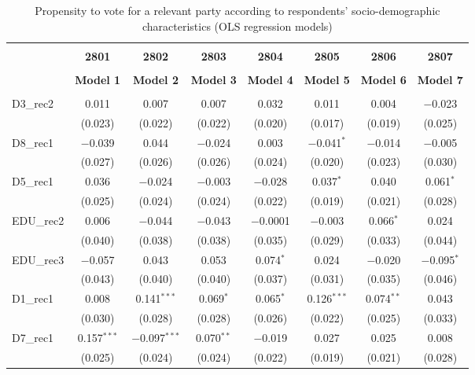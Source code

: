 \documentclass[
]{article}
\begin{document}
\begin{table}[!htbp] \centering 
  \caption{Propensity to vote for a relevant party according to respondents' 
                     socio-demographic characteristics (OLS regression models)} 
  \label{table:full_ols_uk} 
\begin{tabular}{@{\extracolsep{5pt}}lccccccc} 
\\[-1.8ex]\hline \\[-1.8ex] 
 & \textbf{2801} & \textbf{2802} & \textbf{2803} & \textbf{2804} & \textbf{2805} & \textbf{2806} & \textbf{2807} \\ 
\\[-1.8ex] & \textbf{Model 1} & \textbf{Model 2} & \textbf{Model 3} & \textbf{Model 4} & \textbf{Model 5} & \textbf{Model 6} & \textbf{Model 7}\\ 
\hline \\[-1.8ex] 
 D3\_rec2 & 0.011 & 0.007 & 0.007 & 0.032 & 0.011 & 0.004 & $-$0.023 \\ 
  & (0.023) & (0.022) & (0.022) & (0.020) & (0.017) & (0.019) & (0.025) \\ 
  D8\_rec1 & $-$0.039 & 0.044 & $-$0.024 & 0.003 & $-$0.041$^{*}$ & $-$0.014 & $-$0.005 \\ 
  & (0.027) & (0.026) & (0.026) & (0.024) & (0.020) & (0.023) & (0.030) \\ 
  D5\_rec1 & 0.036 & $-$0.024 & $-$0.003 & $-$0.028 & 0.037$^{*}$ & 0.040 & 0.061$^{*}$ \\ 
  & (0.025) & (0.024) & (0.024) & (0.022) & (0.019) & (0.021) & (0.028) \\ 
  EDU\_rec2 & 0.006 & $-$0.044 & $-$0.043 & $-$0.0001 & $-$0.003 & 0.066$^{*}$ & 0.024 \\ 
  & (0.040) & (0.038) & (0.038) & (0.035) & (0.029) & (0.033) & (0.044) \\ 
  EDU\_rec3 & $-$0.057 & 0.043 & 0.053 & 0.074$^{*}$ & 0.024 & $-$0.020 & $-$0.095$^{*}$ \\ 
  & (0.043) & (0.040) & (0.040) & (0.037) & (0.031) & (0.035) & (0.046) \\ 
  D1\_rec1 & 0.008 & 0.141$^{***}$ & 0.069$^{*}$ & 0.065$^{*}$ & 0.126$^{***}$ & 0.074$^{**}$ & 0.043 \\ 
  & (0.030) & (0.028) & (0.028) & (0.026) & (0.022) & (0.025) & (0.033) \\ 
  D7\_rec1 & 0.157$^{***}$ & $-$0.097$^{***}$ & 0.070$^{**}$ & $-$0.019 & 0.027 & 0.025 & 0.008 \\ 
  & (0.025) & (0.024) & (0.024) & (0.022) & (0.019) & (0.021) & (0.028) \\ 

\end{tabular}
\end{table}
\end{document}

